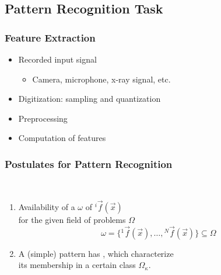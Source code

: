 \subsection{Pattern Recognition Task}

\begin{frame}
   \frametitle{Feature Extraction}

   \begin{itemize}
      \item Recorded input signal
        \begin{itemize}
           \item Camera, microphone, x-ray signal, etc. \\[.5cm]
        \end{itemize}
      \item Digitization: sampling and quantization
      \item Preprocessing
      \item Computation of features
   \end{itemize}
\end{frame}



\begin{frame}
   \frametitle{Postulates for Pattern Recognition}

    \\[.5cm]

   \begin{enumerate}
      \item Availability of a  $\omega$ of  ${}^i\vec{f}(\vec{x})$ \\
        for the given field of problems $\Omega$
        \begin{displaymath}
           \omega = \{{}^1\vec{f}(\vec{x}),\ldots,{}^N\vec{f}(\vec{x})\} \subseteq \Omega
        \end{displaymath}
        \pause

      \item A (simple) pattern has , which characterize \\
        its membership in a certain class $\Omega_\kappa$.
   \end{enumerate}
\end{frame}


